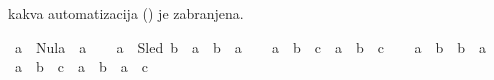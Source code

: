 \begin{isabellebody}
\begin{exercise}[subtitle=Dodatni primeri.]
\begin{isamarkuptext}
      kakva automatizacija () 
      je zabranjena.%
\end{isamarkuptext}\isamarkuptrue%
\isamarkupfalse%
\ {\isachardoublequoteopen}a\ {\isasymoplus}\ Nula\ {\isacharequal}{\kern0pt}\ a{\isachardoublequoteclose}\isanewline
\ \ %
\isadelimproof
%
\endisadelimproof
%
\isatagproof
%
\endisatagproof
{\isafoldproof}%
%
\isadelimproof
%
\endisadelimproof
\isanewline
{}\isamarkupfalse%
\ {\isachardoublequoteopen}a\ {\isasymotimes}\ {\isacharparenleft}{\kern0pt}Sled\ b{\isacharparenright}{\kern0pt}\ {\isacharequal}{\kern0pt}\ a\ {\isasymotimes}\ b\ {\isasymoplus}\ a{\isachardoublequoteclose}\isanewline
\ \ %
\isadelimproof
%
\endisadelimproof
%
\isatagproof
%
\endisatagproof
{\isafoldproof}%
%
\isadelimproof
%
\endisadelimproof
\isanewline
{}\isamarkupfalse%
\ {\isachardoublequoteopen}a\ {\isasymotimes}\ b\ {\isasymotimes}\ c\ {\isacharequal}{\kern0pt}\ a\ {\isasymotimes}\ {\isacharparenleft}{\kern0pt}b\ {\isasymotimes}\ c{\isacharparenright}{\kern0pt}{\isachardoublequoteclose}\isanewline
\ \ %
\isadelimproof
%
\endisadelimproof
%
\isatagproof
%
\endisatagproof
{\isafoldproof}%
%
\isadelimproof
%
\endisadelimproof
\isanewline
{}\isamarkupfalse%
\ {\isachardoublequoteopen}a\ {\isasymotimes}\ b\ {\isacharequal}{\kern0pt}\ b\ {\isasymotimes}\ a{\isachardoublequoteclose}\isanewline
\ \ %
\isadelimproof
%
\endisadelimproof
%
\isatagproof
%
\endisatagproof
{\isafoldproof}%
%
\isadelimproof
%
\endisadelimproof
\isanewline
{}\isamarkupfalse%
\ {\isachardoublequoteopen}a\ {\isasymotimes}\ {\isacharparenleft}{\kern0pt}b\ {\isasymoplus}\ c{\isacharparenright}{\kern0pt}\ {\isacharequal}{\kern0pt}\ a\ {\isasymotimes}\ b\ {\isasymoplus}\ a\ {\isasymotimes}\ c{\isachardoublequoteclose}\isanewline
\ \ %
\isadelimproof
%
\endisadelimproof
%
\isatagproof
%
\endisatagproof
{\isafoldproof}%
%
\isadelimproof
%
\endisadelimproof
%
\end{exercise}
%
\isadelimtheory
%
\endisadelimtheory
%
\isatagtheory
%
\endisatagtheory
{\isafoldtheory}%
%
\isadelimtheory
%
\endisadelimtheory
%
\end{isabellebody}%
\endinput
